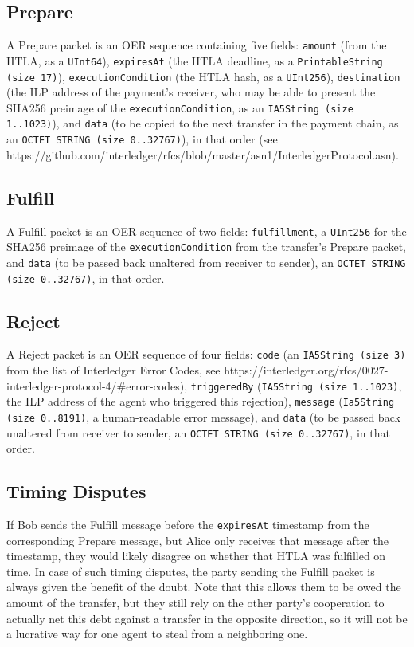 \documentclass[11pt,twoside,a4paper]{article}
\begin{document}
\subsection{Prepare}
A Prepare packet is an OER sequence containing five fields:
{\tt amount} (from the HTLA, as a {\tt UInt64}),
{\tt expiresAt} (the HTLA deadline, as a {\tt PrintableString (size 17)}),
{\tt executionCondition} (the HTLA hash, as a {\tt UInt256}),
{\tt destination} (the ILP address of the payment's receiver, who may be able to present the SHA256 preimage of the {\tt executionCondition}, as an {\tt IA5String (size 1..1023)}), and
{\tt data} (to be copied to the next transfer in the payment chain, as an {\tt OCTET STRING (size 0..32767)}),
in that order (see https://github.com/interledger/rfcs/blob/master/asn1/InterledgerProtocol.asn).

\subsection{Fulfill}
A Fulfill packet is an OER sequence of two fields:
{\tt fulfillment}, a {\tt UInt256} for the SHA256 preimage of the {\tt executionCondition} from the transfer's Prepare packet,
and {\tt data} (to be passed back unaltered from receiver to sender), an {\tt OCTET STRING (size 0..32767)}, in that order.

\subsection{Reject}
A Reject packet is an OER sequence of four fields:
{\tt code} (an {\tt IA5String (size 3)} from the list of Interledger Error Codes, see https://interledger.org/rfcs/0027-interledger-protocol-4/\#error-codes),
{\tt triggeredBy} ({\tt IA5String (size 1..1023)}, the ILP address of the agent who triggered this rejection),
{\tt message} ({\tt Ia5String (size 0..8191)}, a human-readable error message),
and {\tt data} (to be passed back unaltered from receiver to sender, an {\tt OCTET STRING (size 0..32767)}, in that order.

\subsection{Timing Disputes}
If Bob sends the Fulfill message before the {\tt expiresAt} timestamp from the corresponding Prepare message, but Alice only receives that message after the
timestamp, they would likely disagree on whether that HTLA was fulfilled on time. In case of such timing disputes, the party sending the Fulfill
packet is always given the benefit of the doubt. Note that this allows them to be owed the amount of the transfer, but they still rely on the other party's
cooperation to actually net this debt against a transfer in the opposite direction, so it will not be a lucrative way for one agent to steal from a neighboring one.
\end{document}
